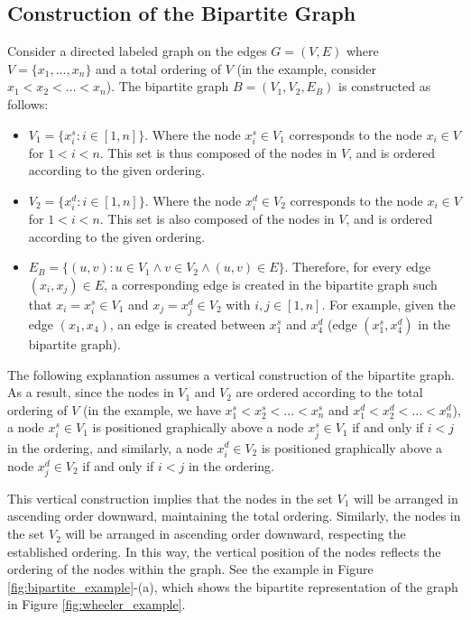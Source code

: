 \subsection{Construction of the Bipartite Graph}
Consider a directed labeled graph on the edges $G=(V,E)$ where $V=\{x_1,\dots,x_n\}$ and a total ordering of $V$ (in the example, consider $x_1<x_2<\dots<x_n$). The bipartite graph $B=(V_1,V_2,E_B)$ is constructed as follows:

\begin{itemize}
    \item $V_1=\{x_i^s : i \in [1, n]\}$. Where the node $x_i^s \in V_1$ corresponds to the node $x_i \in V$ for $1 < i < n$. This set is thus composed of the nodes in $V$, and is ordered according to the given ordering.
    \item $V_2=\{x_i^d : i \in [1, n]\}$. Where the node $x_i^d \in V_2$ corresponds to the node $x_i \in V$ for $1 < i < n$. This set is also composed of the nodes in $V$, and is ordered according to the given ordering.
    \item $E_B=\{(u, v) : u \in V_1 \wedge v \in V_2 \wedge (u,v) \in E\}$. Therefore, for every edge $(x_i,x_j) \in E$, a corresponding edge is created in the bipartite graph such that $x_i = x_i^s \in V_1$ and $x_j=x_j^d \in V_2$ with $i, j \in [1, n]$. For example, given the edge $(x_1, x_4)$, an edge is created between $x_1^s$ and $x_4^d$ (edge $(x_1^s,x_4^d)$ in the bipartite graph).
\end{itemize}

The following explanation assumes a vertical construction of the bipartite graph. As a result, since the nodes in $V_1$ and $V_2$ are ordered according to the total ordering of $V$ (in the example, we have $x_1^s<x_2^s<\dots<x_n^s$ and $x_1^d<x_2^d<\dots<x_n^d$), a node $x_i^s \in V_1$ is positioned graphically above a node $x_j^s \in V_1$ if and only if $i < j$ in the ordering, and similarly, a node $x_i^d \in V_2$ is positioned graphically above a node $x_j^d \in V_2$ if and only if $i < j$ in the ordering.

This vertical construction implies that the nodes in the set $V_1$ will be arranged in ascending order downward, maintaining the total ordering. Similarly, the nodes in the set $V_2$ will be arranged in ascending order downward, respecting the established ordering. In this way, the vertical position of the nodes reflects the ordering of the nodes within the graph. See the example in Figure \ref{fig:bipartite_example}-(a), which shows the bipartite representation of the graph in Figure \ref{fig:wheeler_example}.

